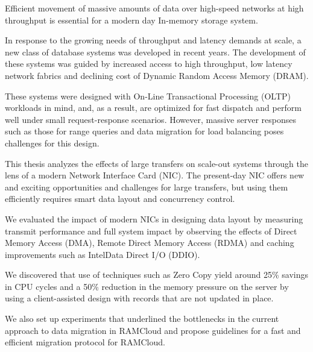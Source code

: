 


Efficient movement of massive amounts of data over high-speed networks at high 
throughput is essential for a modern day In-memory storage system.

In response to the growing needs of throughput and latency demands at scale, a new class of database systems was developed in recent years.
The development of these systems was guided by increased access to high throughput, low latency network fabrics and declining cost of Dynamic Random Access Memory (DRAM).

These systems were designed with On-Line Transactional Processing (OLTP) workloads in mind, and, as a result, are optimized for fast dispatch and perform well under small
request-response scenarios. However, massive server responses such as those for range queries and data migration for load balancing poses challenges for this design.  

This thesis analyzes the effects of large transfers on scale-out systems through the lens of a modern Network Interface Card (NIC).
The present-day NIC offers new and exciting opportunities and challenges for large transfers, but using them efficiently
 requires smart data layout and concurrency control.

We evaluated the impact of modern NICs in designing data layout by measuring transmit 
performance and full system impact by observing the effects of Direct Memory Access (DMA), 
Remote Direct Memory Access (RDMA) and caching improvements such as Intel\textregistered Data Direct I/O (DDIO). 

We discovered that use of techniques such as Zero Copy yield around 25\% savings in CPU cycles and a 50\% reduction in the memory pressure on the server
by using a client-assisted design with records that are not updated in place. 

We also set up experiments that underlined the bottlenecks in the current approach to data migration in RAMCloud and propose guidelines for a fast and efficient migration protocol for RAMCloud.
